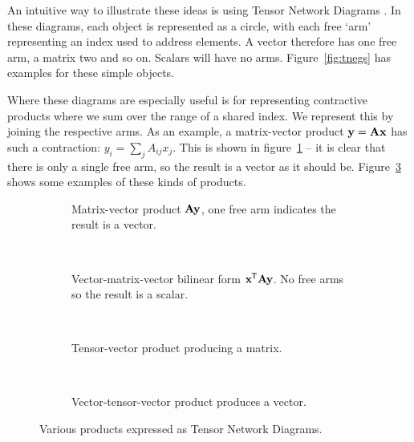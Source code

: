 An intuitive way to illustrate these ideas is using Tensor Network Diagrams
\autocite{Cichocki2016, Orus2014}. In these diagrams, each object is represented
as a circle, with each free `arm' representing an index used to address elements.
A vector therefore has one free arm, a matrix two and so on. Scalars will have
no arms. Figure~\ref{fig:tnegs} has examples for these simple objects. 

Where these diagrams are especially useful is for representing contractive products
where we sum over the range of a shared index. We represent this by joining the
respective arms. As an example, a matrix-vector product \(\mathbf{y} = \mathbf{Ax}\)
has such a contraction: \(y_{i} = \sum_{j}A_{ij}x_{j}\). This is shown in
figure~\ref{fig:tnmatvec} -- it is clear that there is only a single free arm, so the
result is a vector as it should be. Figure~\ref{fig:tnprods} shows some examples
of these kinds of products.

\begin{figure}
	\centering
	\begin{subfigure}[t]{0.45\textwidth}
		\centering
		\caption{Matrix-vector product \(\mathbf{A}\mathbf{y}\), one free arm indicates
		 the result is a vector.}
		 \label{fig:tnmatvec}
	\end{subfigure} ~
	\begin{subfigure}[t]{0.45\textwidth}
		\centering
		\caption{Vector-matrix-vector bilinear form \(\mathbf{x}^{\mkern-1.5mu\mathsf{T}}\mathbf{A}
				 \mathbf{y}\). No free arms so the result is a scalar.}
	\end{subfigure}\\
	\begin{subfigure}[t]{0.45\textwidth}
		\centering
		\caption{Tensor-vector product producing a matrix.}
	\end{subfigure} ~
	\begin{subfigure}[t]{0.45\textwidth}
		\centering
		\caption{Vector-tensor-vector product produces a vector.}
		\label{fig:vanillabilintnd}
	\end{subfigure}
	\caption{Various products expressed as Tensor Network Diagrams.}
	\label{fig:tnprods}
\end{figure}

